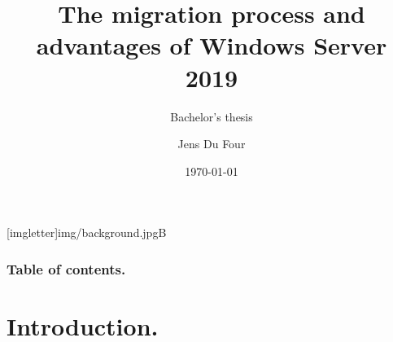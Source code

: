 \documentclass[aspectratio=169]{beamer}
\title{The migration process and advantages of Windows Server 2019}
\subtitle{Bachelor's thesis}
\author{Jens Du Four}
\date{\today}
\begin{document}
{
    [imgletter]{img/background.jpg}{B}  
    \begin{frame}
    \maketitle
    \end{frame}
}
\begin{frame}
  \frametitle{Table of contents.}
  \tableofcontents
\end{frame}
\section{Introduction.}
\end{document}
